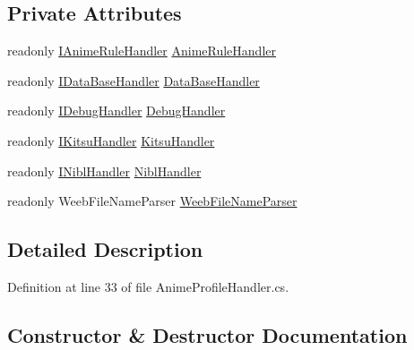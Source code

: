 \subsection*{Private Attributes}
\begin{DoxyCompactItemize}
\item 
readonly \mbox{\hyperlink{interface_little_weeb_library_1_1_handlers_1_1_i_anime_rule_handler}{I\+Anime\+Rule\+Handler}} \mbox{\hyperlink{class_little_weeb_library_1_1_handlers_1_1_anime_profile_handler_aa8248a311fa69699a8230f005bcecdbc}{Anime\+Rule\+Handler}}
\item 
readonly \mbox{\hyperlink{interface_little_weeb_library_1_1_handlers_1_1_i_data_base_handler}{I\+Data\+Base\+Handler}} \mbox{\hyperlink{class_little_weeb_library_1_1_handlers_1_1_anime_profile_handler_a4764b15d1f2aaf7d21aa461508a08a62}{Data\+Base\+Handler}}
\item 
readonly \mbox{\hyperlink{interface_little_weeb_library_1_1_handlers_1_1_i_debug_handler}{I\+Debug\+Handler}} \mbox{\hyperlink{class_little_weeb_library_1_1_handlers_1_1_anime_profile_handler_a0b0ae3c3838d26351485e6dfc566a632}{Debug\+Handler}}
\item 
readonly \mbox{\hyperlink{interface_little_weeb_library_1_1_handlers_1_1_i_kitsu_handler}{I\+Kitsu\+Handler}} \mbox{\hyperlink{class_little_weeb_library_1_1_handlers_1_1_anime_profile_handler_adf3e37895c7834c51b436beed19d1aa5}{Kitsu\+Handler}}
\item 
readonly \mbox{\hyperlink{interface_little_weeb_library_1_1_handlers_1_1_i_nibl_handler}{I\+Nibl\+Handler}} \mbox{\hyperlink{class_little_weeb_library_1_1_handlers_1_1_anime_profile_handler_a4bba317e1a7ee70ecc0d7e108787d399}{Nibl\+Handler}}
\item 
readonly Weeb\+File\+Name\+Parser \mbox{\hyperlink{class_little_weeb_library_1_1_handlers_1_1_anime_profile_handler_a7f6515084315842dded98b57c4f7cd22}{Weeb\+File\+Name\+Parser}}
\end{DoxyCompactItemize}


\subsection{Detailed Description}


Definition at line 33 of file Anime\+Profile\+Handler.\+cs.



\subsection{Constructor \& Destructor Documentation}
\mbox{\label{class_little_weeb_library_1_1_handlers_1_1_anime_profile_handler_ac2f5e6adc1c0a36ff24797a437bf490d}} 
